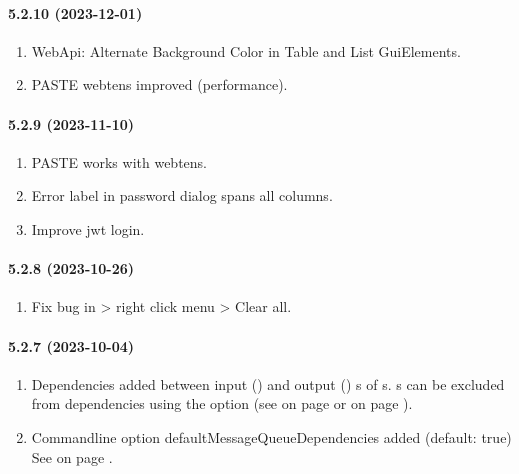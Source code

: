 \paragraph{5.2.10 (2023-12-01)}  %
\begin{enumerate}
\item WebApi: Alternate Background Color in Table and List GuiElements.
\item PASTE webtens improved (performance).
\end{enumerate}

\paragraph{5.2.9 (2023-11-10)}  %
\begin{enumerate}
\item PASTE works with webtens.
\item Error label in password dialog spans all columns.
\item Improve jwt login.
\end{enumerate}

\paragraph{5.2.8 (2023-10-26)}  %
\begin{enumerate}
\item Fix bug in \TABLE{} > right click menu > Clear all.
\end{enumerate}

\paragraph{5.2.7 (2023-10-04)}  %
\begin{enumerate}
\item Dependencies added between input (\REQUEST) and output (\RESPONSE) \STREAM{}s of
      \MESSAGEQUEUE{} \REQUEST{}s. \newline
      \STREAM{}s can be excluded from dependencies using the option \NODEPENDENCIES{}
      (see  on page \pageref{dia:jobmessagequeueoption} or
       on page \pageref{dia:jobpluginoption}).
\item Commandline option defaultMessageQueueDependencies added (default: true)
      See  on page \pageref{sec:cloptions}.
\end{enumerate}

